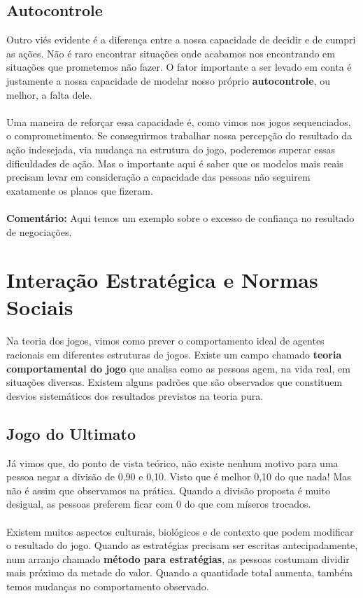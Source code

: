 \documentclass[a4paper,11pt,oneside]{book}
\theoremstyle{definition}
\theoremstyle{break}
\begin{document}
\subsection{Autocontrole}

Outro viés evidente é a  diferença entre a nossa capacidade de decidir e de cumpri as ações. Não é raro encontrar situações onde acabamos nos encontrando em situações que prometemos não fazer. O fator importante a ser levado em conta é justamente a nossa capacidade de modelar nosso próprio \textbf{autocontrole}, ou melhor, a falta dele.
\\
\\
Uma maneira de reforçar essa capacidade é, como vimos nos jogos sequenciados, o comprometimento. Se conseguirmos trabalhar nossa percepção do resultado da ação indesejada, via mudança na estrutura do jogo, poderemos superar essas dificuldades de ação. Mas o importante aqui é saber que os modelos mais reais precisam levar em consideração a capacidade das pessoas não seguirem exatamente os planos que fizeram.
\\
\\
\textbf{Comentário:} Aqui temos um exemplo sobre o excesso de confiança no resultado de negociações.

\section{Interação Estratégica e Normas Sociais}

Na teoria dos jogos, vimos como prever o comportamento ideal de agentes racionais em diferentes estruturas de jogos. Existe um campo chamado \textbf{teoria comportamental do jogo} que analisa como as pessoas agem, na vida real, em situações diversas. Existem alguns padrões que são observados que constituem desvios sistemáticos dos resultados previstos na teoria pura.

\subsection{Jogo do Ultimato}

Já vimos que, do ponto de vista teórico, não existe nenhum motivo para uma pessoa negar a divisão de 0,90 e 0,10. Visto que é melhor 0,10 do que nada! Mas não é assim que observamos  na prática. Quando a divisão proposta é muito desigual, as pessoas preferem ficar com 0 do que com míseros trocados.
\\
\\
Existem muitos aspectos culturais, biológicos e de contexto que podem modificar o resultado do jogo. Quando as estratégias precisam ser escritas antecipadamente, num arranjo chamado \textbf{método para estratégias}, as pessoas costumam dividir mais próximo da metade do valor. Quando a quantidade total aumenta, também temos mudanças no comportamento observado.
\end{document}
